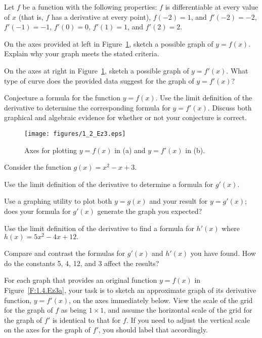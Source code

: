 \begin{exercises} 
\item Let $f$ be a function with the following properties:  $f$ is differentiable at every value of $x$ (that is, $f$ has a derivative at every point), $f(-2) = 1$, and $f'(-2) = -2$, $f'(-1) = -1$, $f'(0) = 0$, $f'(1) = 1$, and $f'(2) = 2$.
\ba
	\item On the axes provided at left in Figure~\ref{F:1.4.Ez1}, sketch a possible graph of $y = f(x)$.  Explain why your graph meets the stated criteria.
	\item On the axes at right in Figure~\ref{F:1.4.Ez1}, sketch a possible graph of $y = f'(x)$.  What type of curve does the provided data suggest for the graph of $y = f'(x)$?
	\item Conjecture a formula for the function $y = f(x)$.  Use the limit definition of the derivative to determine the corresponding formula for $y = f'(x)$.  Discuss both graphical and algebraic evidence for whether or not your conjecture is correct.
\ea
\begin{figure}[h]
  \begin{center}
 \texttt{[image: figures/1\_2\_Ez3.eps]} %
   \end{center}
   \caption{Axes for plotting $y = f(x)$ in (a) and $y = f'(x)$ in (b).} \label{F:1.4.Ez1}
\end{figure}
\begin{exerciseSolution}
\end{exerciseSolution}

\item Consider the function $g(x) = x^2 - x + 3$.
\ba
	\item Use the limit definition of the derivative to determine a formula for $g'(x)$.
	\item Use a graphing utility to plot both $y = g(x)$ and your result for $y = g'(x)$; does your formula for $g'(x)$ generate the graph you expected?
	\item Use the limit definition of the derivative to find a formula for $h'(x)$ where $h(x) = 5x^2 - 4x + 12.$
	\item Compare and contrast the formulas for $g'(x)$ and $h'(x)$ you have found.  How do the constants 5, 4, 12, and 3 affect the results?
\ea	

\item For each graph that provides an original function $y = f(x)$ in Figure~\ref{F:1.4.Ez3a}, your task is to sketch an approximate graph of its derivative function, $y = f'(x)$, on the axes immediately below.  View the scale of the grid for the graph of $f$ as being $1 \times 1$, and assume the horizontal scale of the grid for the graph of $f'$ is identical to that for $f$.  If you need to adjust the vertical scale on the axes for the graph of $f'$, you should label that accordingly.


\end{exercises}
